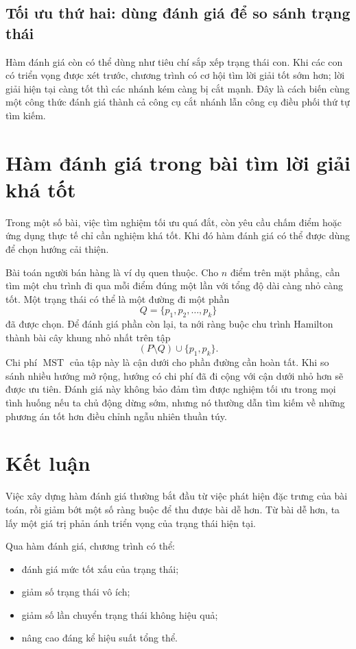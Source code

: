\documentclass[11pt]{article}
\newcommand{\MST}{\operatorname{MST}}
\begin{document}
\subsection*{Tối ưu thứ hai: dùng đánh giá để so sánh trạng thái}

Hàm đánh giá còn có thể dùng như tiêu chí sắp xếp trạng thái con. Khi các con
có triển vọng được xét trước, chương trình có cơ hội tìm lời giải tốt sớm
hơn; lời giải hiện tại càng tốt thì các nhánh kém càng bị cắt mạnh. Đây là
cách biến cùng một công thức đánh giá thành cả công cụ cắt nhánh lẫn công cụ
điều phối thứ tự tìm kiếm.

\section{Hàm đánh giá trong bài tìm lời giải khá tốt}

Trong một số bài, việc tìm nghiệm tối ưu quá đắt, còn yêu cầu chấm điểm hoặc
ứng dụng thực tế chỉ cần nghiệm khá tốt. Khi đó hàm đánh giá có thể được dùng
để chọn hướng cải thiện.

Bài toán người bán hàng là ví dụ quen thuộc. Cho \(n\) điểm trên mặt phẳng,
cần tìm một chu trình đi qua mỗi điểm đúng một lần với tổng độ dài càng nhỏ
càng tốt. Một trạng thái có thể là một đường đi một phần
\[
  Q=\{p_1,p_2,\ldots,p_k\}
\]
đã được chọn. Để đánh giá phần còn lại, ta nới ràng buộc chu trình Hamilton
thành bài cây khung nhỏ nhất trên tập
\[
  (P\setminus Q)\cup\{p_1,p_k\}.
\]
Chi phí \(\MST\) của tập này là cận dưới cho phần đường cần hoàn tất. Khi so
sánh nhiều hướng mở rộng, hướng có chi phí đã đi cộng với cận dưới nhỏ hơn sẽ
được ưu tiên. Đánh giá này không bảo đảm tìm được nghiệm tối ưu trong mọi tình
huống nếu ta chủ động dừng sớm, nhưng nó thường dẫn tìm kiếm về những phương
án tốt hơn điều chỉnh ngẫu nhiên thuần túy.

\section{Kết luận}

Việc xây dựng hàm đánh giá thường bắt đầu từ việc phát hiện đặc trưng của bài
toán, rồi giảm bớt một số ràng buộc để thu được bài dễ hơn. Từ bài dễ hơn, ta
lấy một giá trị phản ánh triển vọng của trạng thái hiện tại.

Qua hàm đánh giá, chương trình có thể:
\begin{itemize}
  \item đánh giá mức tốt xấu của trạng thái;
  \item giảm số trạng thái vô ích;
  \item giảm số lần chuyển trạng thái không hiệu quả;
  \item nâng cao đáng kể hiệu suất tổng thể.
\end{itemize}
\end{document}
